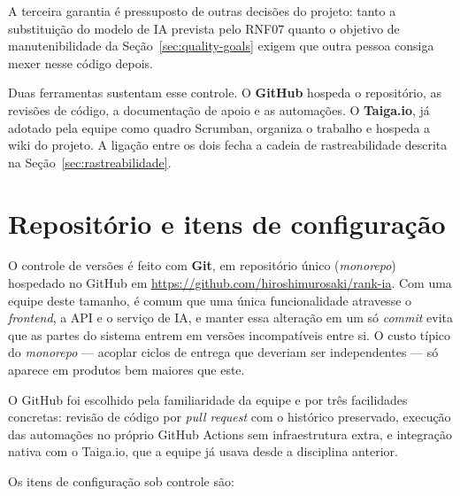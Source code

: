 \documentclass[a4paper,12pt,oneside,openany]{book}
\newif\iforientacoes
\newcommand{\orientacao}[1]{%
    \iforientacoes
        \begin{quote}
        \small\itshape\textbf{Orientação:} #1
        \end{quote}
    \fi
}
\begin{document}
A terceira garantia é pressuposto de outras decisões do projeto: tanto a
substituição do modelo de IA prevista pelo RNF07 quanto o objetivo de
manutenibilidade da Seção~\ref{sec:quality-goals} exigem que outra pessoa
consiga mexer nesse código depois.

Duas ferramentas sustentam esse controle. O \textbf{GitHub} hospeda o
repositório, as revisões de código, a documentação de apoio e as automações. O
\textbf{Taiga.io}, já adotado pela equipe como quadro Scrumban, organiza o
trabalho e hospeda a wiki do projeto. A ligação entre os dois fecha a cadeia de
rastreabilidade descrita na Seção~\ref{sec:rastreabilidade}.

\section{Repositório e itens de configuração}

\orientacao{Informem o repositório utilizado e identifiquem os principais
itens de configuração que precisam ser controlados, por exemplo: código-fonte,
arquivos de configuração, scripts, documentação, modelos de dados e testes.
}

O controle de versões é feito com \textbf{Git}, em repositório único
(\textit{monorepo}) hospedado no GitHub em
\url{https://github.com/hiroshimurosaki/rank-ia}. Com uma equipe deste tamanho,
é comum que uma única funcionalidade atravesse o \textit{frontend}, a API e o
serviço de IA, e manter essa alteração em um só \textit{commit} evita que as
partes do sistema entrem em versões incompatíveis entre si. O custo típico do
\textit{monorepo} --- acoplar ciclos de entrega que deveriam ser independentes
--- só aparece em produtos bem maiores que este.

O GitHub foi escolhido pela familiaridade da equipe e por três facilidades
concretas: revisão de código por \textit{pull request} com o histórico
preservado, execução das automações no próprio GitHub Actions sem
infraestrutura extra, e integração nativa com o Taiga.io, que a equipe já usava
desde a disciplina anterior.

Os itens de configuração sob controle são:
\end{document}
